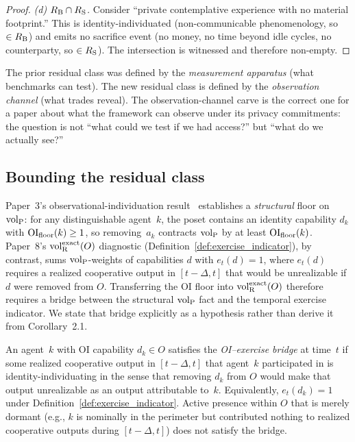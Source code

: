 \begin{proof}
\emph{(d) $R_{\mathrm{B}} \cap R_{\mathrm{S}}$.}
Consider ``private contemplative experience with no material
footprint.''  This is identity-individuated (non-communicable
phenomenology, so $\in R_{\mathrm{B}}$) and emits no sacrifice event (no
money, no time beyond idle cycles, no counterparty, so
$\in R_{\mathrm{S}}$).  The intersection is witnessed and therefore
non-empty.
\end{proof}

\begin{remark}
The prior residual class was defined by the \emph{measurement
apparatus} (what benchmarks can test).  The new residual class is
defined by the \emph{observation channel} (what trades reveal).
The observation-channel carve is the correct one for a paper about
what the framework can observe under its privacy commitments: the
question is not ``what could we test if we had access?'' but
``what do we actually see?''
\end{remark}

\subsection{Bounding the residual class}

Paper~3's observational-individuation
result~\citep[Corollary~2.1]{lasser2026horizon} establishes a
\emph{structural} floor on ${\operatorname{vol}_{\mathrm{P}}}$: for any distinguishable
agent~$k$, the poset contains an identity capability $d_k$ with
$\mathrm{OI}_{\mathrm{floor}}(k) \geq 1$, so removing~$a_k$ contracts ${\operatorname{vol}_{\mathrm{P}}}$ by at
least $\mathrm{OI}_{\mathrm{floor}}(k)$.  Paper~8's ${\operatorname{vol}_{\mathrm{R}}^{\mathrm{exact}}}(O)$ diagnostic
(Definition~\ref{def:exercise_indicator}), by contrast, sums
${\operatorname{vol}_{\mathrm{P}}}$-weights of capabilities $d$ with $e_t(d) = 1$, where
$e_t(d)$ requires a realized cooperative output in
$[t-\Delta, t]$ that would be unrealizable if $d$ were removed
from $O$.  Transferring the OI floor into ${\operatorname{vol}_{\mathrm{R}}^{\mathrm{exact}}}(O)$
therefore requires a bridge between the structural ${\operatorname{vol}_{\mathrm{P}}}$ fact
and the temporal exercise indicator.  We state that bridge
explicitly as a hypothesis rather than derive it from
Corollary~2.1.

\begin{definition}
\label{def:oi_exercise_bridge}
An agent~$k$ with OI capability $d_k \in O$ satisfies the
\emph{OI--exercise bridge} at time~$t$ if some realized
cooperative output in $[t-\Delta, t]$ that agent~$k$
participated in is identity-individuating in the sense that
removing $d_k$ from $O$ would make that output unrealizable as
an output attributable to~$k$.  Equivalently,
$e_t(d_k) = 1$ under
Definition~\ref{def:exercise_indicator}.  Active presence within
$O$ that is merely dormant (e.g., $k$ is nominally in the
perimeter but contributed nothing to realized cooperative
outputs during $[t-\Delta, t]$) does not satisfy the bridge.
\end{definition}

